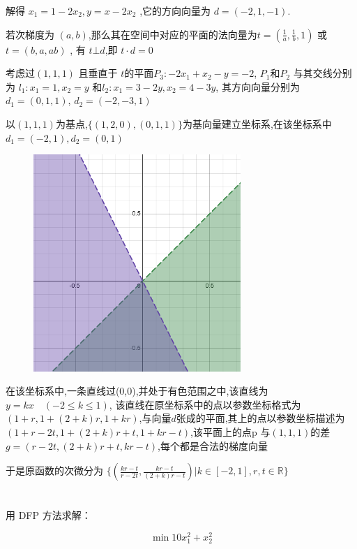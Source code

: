 \documentclass[a4paper]{article}
\begin{document}
解得 \( x_1 = 1-2x_2, y = x-2x_2\) ,它的方向向量为 \(d= (-2,1,-1)\).

若次梯度为 \((a,b)\),那么其在空间中对应的平面的法向量为\( t = (\frac{1}{a},\frac{1}{b},1)\) 或\(t = (b,a,ab)\) , 有 \(t \bot d\),即 \(t \cdot d = 0\)

考虑过$(1,1,1)$ 且垂直于 $t$的平面$P_3: -2x_1 +x_2 - y = -2$, $P_1$和$P_2$ 与其交线分别为 
$l_1 : x_1 = 1,x_2 = y$ 和$l_2 : x_1 = 3-2y,x_2 = 4-3y$,   其方向向量分别为 $d_1 = (0,1,1)$, $d_2 = (-2,-3,1)$

以$(1,1,1)$为基点,$\{(1,2,0),(0,1,1)\}$为基向量建立坐标系,在该坐标系中$d_1 = (-2,1),d_2 = (0,1)$

\begin{figure}[H]
    \centering
    \includegraphics[width=0.7\textwidth]{pic/p5s3.png}
\end{figure}

在该坐标系中,一条直线过(0,0),并处于有色范围之中,该直线为 $y = kx \quad (-2 \leq k \leq 1)$, 该直线在原坐标系中的点以参数坐标格式为$(1+r,1+(2+k)r,1+kr)$,与向量$d$张成的平面,其上的点以参数坐标描述为 $(1+r - 2t,1+ (2+k)r +t, 1+kr-t)$,该平面上的点p 与$(1,1,1)$的差 $g = (r - 2t,(2+k)r + t , kr-t)$,每个都是合法的梯度向量

于是原函数的次微分为 \(\{(\frac{kr-t}{r-2t},\frac{kr-t}{(2+k)r-t}) | k \in [-2,1], r,t \in \mathbb{R}\}\)


\section{}

用 DFP 方法求解：

\[\min 10x_1^2 + x_2^2\]
\end{document}

